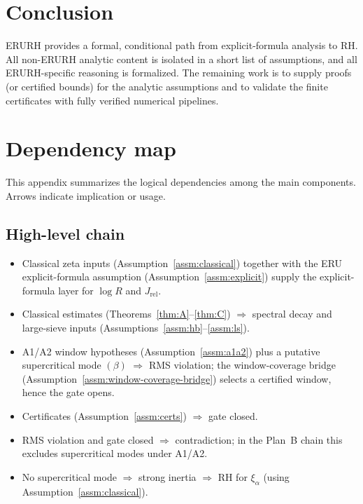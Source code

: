\documentclass[11pt]{article}
\theoremstyle{plain}
\theoremstyle{definition}
\newcommand{\code}[1]{\path{#1}}
\begin{document}
\section{Conclusion}
ERURH provides a formal, conditional path from explicit-formula analysis to RH.
All non-ERURH analytic content is isolated in a short list of assumptions, and
all ERURH-specific reasoning is formalized. The remaining work is to supply
proofs (or certified bounds) for the analytic assumptions and to validate the
finite certificates with fully verified numerical pipelines.

\appendix
\section{Dependency map}\label{app:dependencies}
This appendix summarizes the logical dependencies among the main components.
Arrows indicate implication or usage.

\subsection*{High-level chain}
\begin{itemize}
  \item Classical zeta inputs (Assumption~\ref{assm:classical}) together with
  the ERU explicit-formula assumption (Assumption~\ref{assm:explicit}) supply
  the explicit-formula layer for $\log R$ and $J_{\mathrm{rel}}$.
  \item Classical estimates (Theorems~\ref{thm:A}--\ref{thm:C})
  $\Rightarrow$ spectral decay and large-sieve inputs
  (Assumptions~\ref{assm:hb}--\ref{assm:ls}).
  \item A1/A2 window hypotheses (Assumption~\ref{assm:a1a2}) plus a
  putative supercritical mode \code{ERU_mode_beta}$(\beta)$
  $\Rightarrow$ RMS violation; the window-coverage bridge
  (Assumption~\ref{assm:window-coverage-bridge}) selects a certified window,
  hence the gate opens.
  \item Certificates (Assumption~\ref{assm:certs})
  $\Rightarrow$ gate closed.
  \item RMS violation and gate closed $\Rightarrow$ contradiction; in the
  Plan~B chain this excludes supercritical modes under A1/A2.
  \item No supercritical mode $\Rightarrow$ strong inertia
  $\Rightarrow$ RH for $\xi_\alpha$ (using Assumption~\ref{assm:classical}).
\end{itemize}
\end{document}

